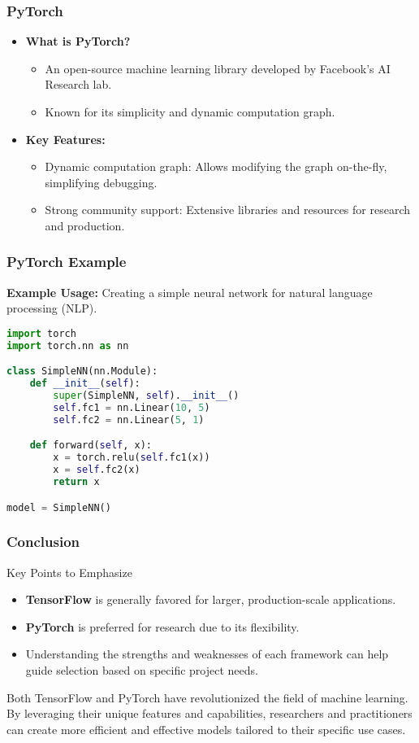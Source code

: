 \documentclass[aspectratio=169]{beamer}
\begin{document}
\begin{frame}
    \frametitle{PyTorch}
    \begin{itemize}
        \item \textbf{What is PyTorch?}
            \begin{itemize}
                \item An open-source machine learning library developed by Facebook’s AI Research lab.
                \item Known for its simplicity and dynamic computation graph.
            \end{itemize}
        \item \textbf{Key Features:}
            \begin{itemize}
                \item Dynamic computation graph: Allows modifying the graph on-the-fly, simplifying debugging.
                \item Strong community support: Extensive libraries and resources for research and production.
            \end{itemize}
    \end{itemize}
\end{frame}

\begin{frame}[fragile]
    \frametitle{PyTorch Example}
    \textbf{Example Usage:} Creating a simple neural network for natural language processing (NLP).

    \begin{lstlisting}[language=Python]
import torch
import torch.nn as nn

class SimpleNN(nn.Module):
    def __init__(self):
        super(SimpleNN, self).__init__()
        self.fc1 = nn.Linear(10, 5)
        self.fc2 = nn.Linear(5, 1)

    def forward(self, x):
        x = torch.relu(self.fc1(x))
        x = self.fc2(x)
        return x

model = SimpleNN()
    \end{lstlisting}
\end{frame}

\begin{frame}
    \frametitle{Conclusion}
    \begin{block}{Key Points to Emphasize}
        \begin{itemize}
            \item \textbf{TensorFlow} is generally favored for larger, production-scale applications.
            \item \textbf{PyTorch} is preferred for research due to its flexibility.
            \item Understanding the strengths and weaknesses of each framework can help guide selection based on specific project needs.
        \end{itemize}
    \end{block}
    Both TensorFlow and PyTorch have revolutionized the field of machine learning. By leveraging their unique features and capabilities, researchers and practitioners can create more efficient and effective models tailored to their specific use cases.
\end{frame}
\end{document}
